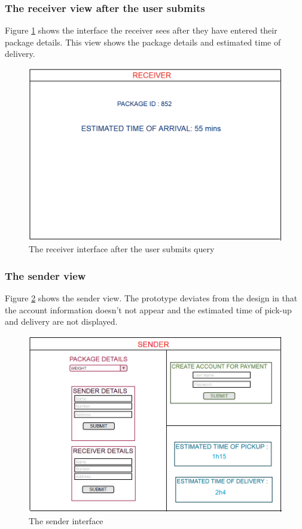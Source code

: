 \documentclass[paper=a4, fontsize=11pt]{scrartcl} %
\numberwithin{equation}{section} %
\numberwithin{figure}{section} %
\numberwithin{table}{section} %
\begin{document}
\subsubsection{The receiver view after the user submits}
Figure \ref{ReceiverAfter} shows the interface the receiver sees after they have entered their package details. This view shows the package details and estimated time of delivery.
\begin{figure}[hbt!]
\centering
\includegraphics[width=5in]{receiverAfter.png}
\caption{The receiver interface after the user submits query} 
\label{ReceiverAfter}
\end{figure}

\subsubsection{The sender view}
Figure \ref{Sender} shows the sender view. The prototype deviates from the design in that the account information doesn't not appear and the estimated time of pick-up and delivery are not displayed.
\begin{figure}[hbt!]
\centering
\includegraphics[width=5in]{sender.png}
\caption{The sender interface}
\label{Sender}
\end{figure}
\end{document}
